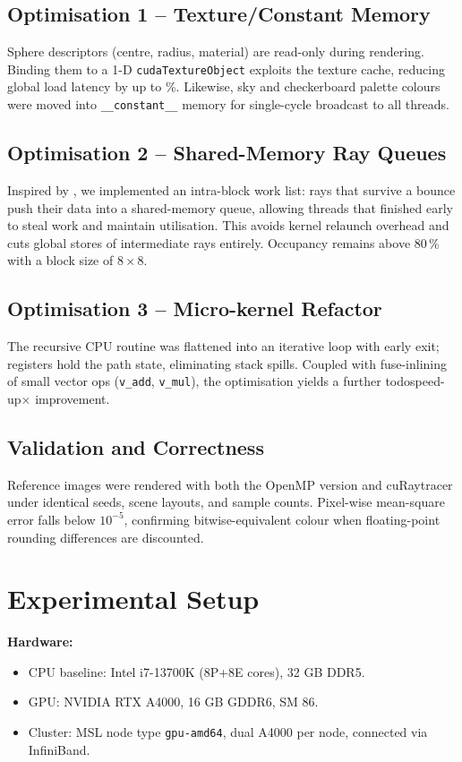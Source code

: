 \subsection{Optimisation 1 – Texture/Constant Memory}
Sphere descriptors (centre, radius, material) are read-only during
rendering.  Binding them to a 1-D \texttt{cudaTextureObject} exploits
the texture cache, reducing global load latency by up to
\%.  Likewise, sky and checkerboard palette
colours were moved into \texttt{\_\_constant\_\_} memory for single-cycle
broadcast to all threads.

\subsection{Optimisation 2 – Shared-Memory Ray Queues}
Inspired by \cite{Pitkin2014}, we implemented an intra-block work list:
rays that survive a bounce push their data into a shared-memory queue,
allowing threads that finished early to steal work and maintain
utilisation.  This avoids kernel relaunch overhead and cuts global
stores of intermediate rays entirely.  Occupancy remains above
80\,\% with a block size of $8\times 8$.

\subsection{Optimisation 3 – Micro-kernel Refactor}
The recursive CPU routine was flattened into an iterative loop with
early exit; registers hold the path state, eliminating stack spills.
Coupled with fuse-inlining of small vector ops
(\texttt{v\_add}, \texttt{v\_mul}), the optimisation yields a further
todo{speed-up}× improvement.

\subsection{Validation and Correctness}
Reference images were rendered with both the OpenMP version and
cuRaytracer under identical seeds, scene layouts, and sample counts.
Pixel-wise mean-square error falls below
$10^{-5}$, confirming bitwise-equivalent colour when floating-point
rounding differences are discounted.

\section{Experimental Setup}
\textbf{Hardware:}  
\begin{itemize}
  \item CPU baseline: Intel i7-13700K (8P+8E cores), 32 GB DDR5.
  \item GPU: NVIDIA RTX A4000, 16 GB GDDR6, SM 86.
  \item Cluster: MSL node type \texttt{gpu-amd64}, dual A4000 per node,
        connected via InfiniBand.
\end{itemize}

